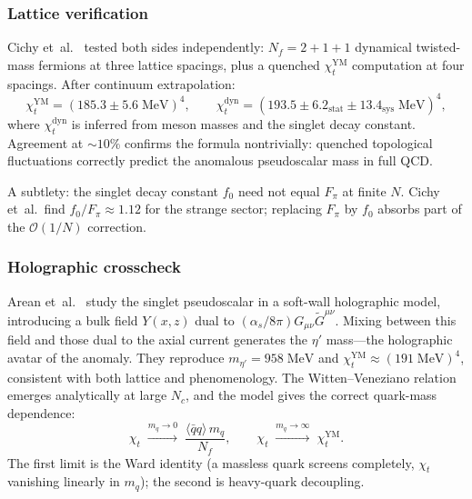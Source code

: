 \subsubsection{Lattice verification}

Cichy et~al.\ \cite{CichyLatticeWittenVeneziano} tested both sides independently: $N_f = 2+1+1$ dynamical twisted-mass fermions at three lattice spacings, plus a quenched $\chi_t^{\mathrm{YM}}$ computation at four spacings.  After continuum extrapolation:
\begin{equation}\label{eq:lattice-wv-results}
  \chi_t^{\mathrm{YM}} = (185.3 \pm 5.6\;\mathrm{MeV})^4, \qquad
  \chi_t^{\mathrm{dyn}} = (193.5 \pm 6.2_{\mathrm{stat}} \pm 13.4_{\mathrm{sys}}\;\mathrm{MeV})^4,
\end{equation}
where $\chi_t^{\mathrm{dyn}}$ is inferred from meson masses and the singlet decay constant.  Agreement at $\sim\!10\%$ confirms the formula nontrivially: quenched topological fluctuations correctly predict the anomalous pseudoscalar mass in full QCD.

A subtlety: the singlet decay constant $f_0$ need not equal $F_\pi$ at finite $N$.  Cichy et~al.\ find $f_0/F_\pi \approx 1.12$ for the strange sector; replacing $F_\pi$ by $f_0$ absorbs part of the $\mathcal{O}(1/N)$ correction.

\subsubsection{Holographic crosscheck}

Arean et~al.\ \cite{AreanU1AHolographicQCD} study the singlet pseudoscalar in a soft-wall holographic model, introducing a bulk field $Y(x,z)$ dual to $(\alpha_s/8\pi)G_{\mu\nu}\tilde{G}^{\mu\nu}$.  Mixing between this field and those dual to the axial current generates the $\eta'$ mass---the holographic avatar of the anomaly.  They reproduce $m_{\eta'} = 958\;\mathrm{MeV}$ and $\chi_t^{\mathrm{YM}} \approx (191\;\mathrm{MeV})^4$, consistent with both lattice and phenomenology.  The Witten--Veneziano relation emerges analytically at large $N_c$, and the model gives the correct quark-mass dependence:
\begin{equation}\label{eq:chi-t-mass-dependence}
  \chi_t \;\xrightarrow{m_q\to 0}\; \frac{\langle\bar{q}q\rangle\, m_q}{N_f}, \qquad
  \chi_t \;\xrightarrow{m_q\to\infty}\; \chi_t^{\mathrm{YM}}.
\end{equation}
The first limit is the Ward identity (a massless quark screens completely, $\chi_t$ vanishing linearly in $m_q$); the second is heavy-quark decoupling.

